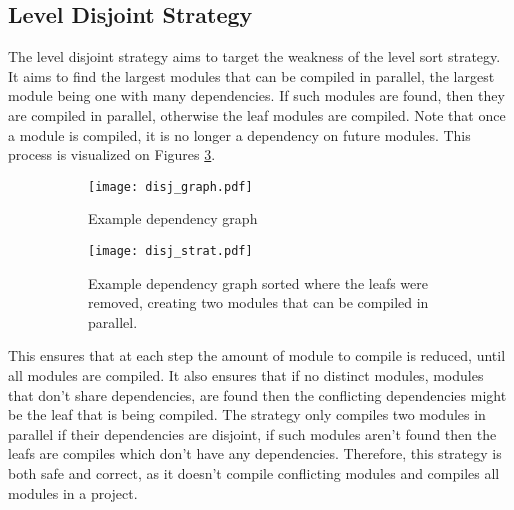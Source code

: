 

\pagebreak
\subsection{Level Disjoint Strategy} \label{sub:design disjoint strategy}

The level disjoint strategy aims to target the weakness of the level sort
strategy. It aims to find the largest modules that can be compiled in parallel,
the largest module being one with many dependencies. If such modules are found,
then they are compiled in parallel, otherwise the leaf modules are compiled.
Note that once a module is compiled, it is no longer a dependency on future
modules. This process is visualized on Figures \ref{subfig:disj strat}.
\begin{figure}[H]
  \begin{subfigure}[t]{0.5\textwidth}
    \centering
    \texttt{[image: disj\_graph.pdf]}
    \caption{Example dependency graph}
    \label{fig:example disj dep graph}
  \end{subfigure} \hfill
  \begin{subfigure}[t]{0.40\textwidth}
    \centering
    \texttt{[image: disj\_strat.pdf]}
    \caption{Example dependency graph sorted where the leafs were removed,
    creating two modules that can be compiled in parallel. }
    \label{fig:example disj strat}
  \end{subfigure}
  \caption{}
  \label{subfig:disj strat}
\end{figure}

This ensures that at each step the amount of module to compile is reduced,
until all modules are compiled. It also ensures that if no distinct modules,
modules that don't share dependencies, are found then the conflicting
dependencies might be the leaf that is being compiled. The strategy only
compiles two modules in parallel if their dependencies are disjoint, if such
modules aren't found then the leafs are compiles which don't have any
dependencies. Therefore, this strategy is both safe and correct, as it doesn't
compile conflicting modules and compiles all modules in a project.


